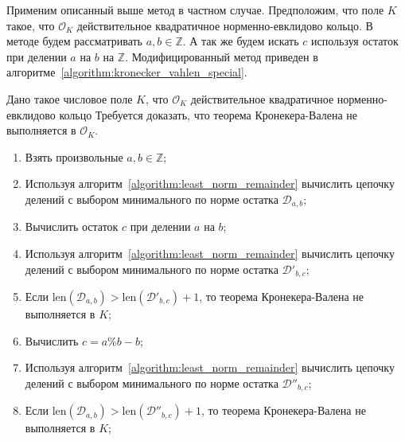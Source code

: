 \documentclass[_00_dissertation.tex]{subfiles}
\begin{document}

Применим описанный выше метод в частном случае.
Предположим, что поле $K$ такое, что $\mathcal{O}_K$ действительное квадратичное норменно-евклидово кольцо.
В методе будем рассматривать $a, b \in \mathbb{Z}$.
А так же будем искать $c$ используя остаток при делении $a$ на $b$ на $\mathbb{Z}$.
Модифицированный метод приведен в алгоритме~\ref{algorithm:kronecker_vahlen_special}.

\begin{algorithm}\label{algorithm:kronecker_vahlen_special}
    Дано такое числовое поле $K$, что $\mathcal{O}_K$ действительное квадратичное норменно-евклидово кольцо
    Требуется доказать, что теорема Кронекера-Валена не выполняется в $\mathcal{O}_K$.

    \begin{enumerate}
        \item Взять произвольные $a, b \in \mathbb{Z}$;

        \item Используя алгоритм~\ref{algorithm:least_norm_remainder} вычислить цепочку делений с выбором минимального по норме остатка $\mathcal{D}_{a,b}$;

        \item Вычислить остаток $c$ при делении $a$ на $b$;

        \item Используя алгоритм~\ref{algorithm:least_norm_remainder} вычислить цепочку делений с выбором минимального по норме остатка $\mathcal{D}'_{b, c}$;

        \item Если $\textrm{len}(\mathcal{D}_{a, b}) > \textrm{len}(\mathcal{D}'_{b, c}) + 1$, то теорема Кронекера-Валена не выполняется в $K$;

        \item Вычислить $c = a \% b - b$;

        \item Используя алгоритм~\ref{algorithm:least_norm_remainder} вычислить цепочку делений с выбором минимального по норме остатка $\mathcal{D}''_{b,c}$;

        \item Если $\textrm{len}(\mathcal{D}_{a, b}) > \textrm{len}(\mathcal{D}''_{b, c}) + 1$, то теорема Кронекера-Валена не выполняется в $K$;
    \end{enumerate}
\end{algorithm}
\end{document}

